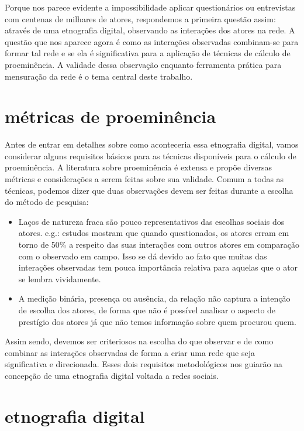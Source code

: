 \documentclass{article}
\begin{document}
Porque nos parece evidente a impossibilidade aplicar questionários ou
entrevistas com centenas de milhares de atores, respondemos a primeira questão
assim: através de uma etnografia digital, observando as interações dos atores na
rede. A questão que nos aparece agora é como as interações observadas
combinam-se para formar tal rede e se ela é significativa para a aplicação de
técnicas de cálculo de proeminência. A validade dessa observação enquanto
ferramenta prática para mensuração da rede é o tema central deste trabalho.

\section{métricas de proeminência}

Antes de entrar em detalhes sobre como aconteceria essa etnografia digital,
vamos considerar alguns requisitos básicos para as técnicas disponíveis para o
cálculo de proeminência. A literatura sobre proeminência é extensa e propõe
diversas métricas e considerações a serem feitas sobre sua validade. Comum a
todas as técnicas, podemos dizer que duas observações devem ser feitas durante
a escolha do método de pesquisa:
\begin{itemize}
\item Laços de natureza fraca são pouco representativos das escolhas sociais dos
atores. e.g.: estudos mostram que quando questionados, os atores erram em torno
de 50\% a respeito das suas interações com outros atores em comparação com o
observado em campo. Isso se dá devido ao fato que muitas das interações
observadas tem pouca importância relativa para aquelas que o ator se lembra
vividamente.
\item A medição binária, presença ou ausência, da relação não captura a intenção
de escolha dos atores, de forma que não é possível analisar o aspecto de
prestígio dos atores já que não temos informação sobre quem procurou quem.
\end{itemize}

Assim sendo, devemos ser criteriosos na escolha do que observar e de como
combinar as interações observadas de forma a criar uma rede que seja
significativa e direcionada. Esses dois requisitos metodológicos nos guiarão na
concepção de uma etnografia digital voltada a redes sociais.

\section{etnografia digital}
\end{document}

